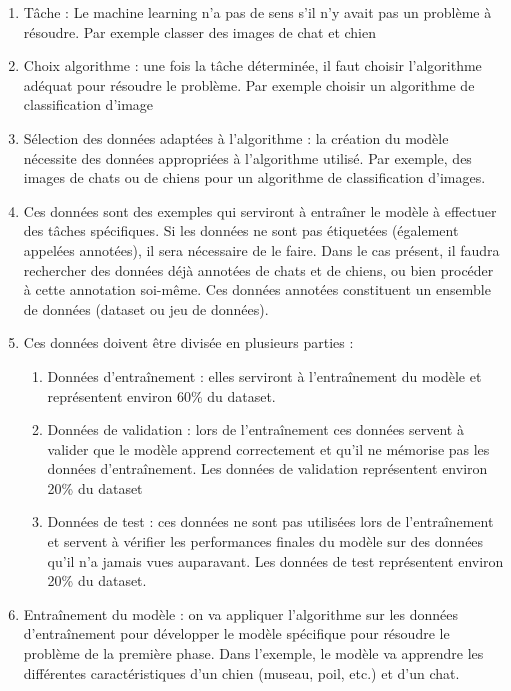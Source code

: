 \begin{enumerate}
    \item Tâche : Le machine learning n'a pas de sens s'il n'y avait pas un problème à résoudre. Par exemple classer des images de chat et chien
    
    \item Choix algorithme : une fois la tâche déterminée, il faut choisir l'algorithme adéquat pour résoudre le problème. Par exemple choisir un algorithme de classification d'image
    
    \item Sélection des données adaptées à l'algorithme : la création du modèle nécessite des données appropriées à l'algorithme utilisé. Par exemple, des images de chats ou de chiens pour un algorithme de classification d'images.
    
    \item Ces données sont des exemples qui serviront à entraîner le modèle à effectuer des tâches spécifiques. Si les données ne sont pas étiquetées (également appelées annotées), il sera nécessaire de le faire. Dans le cas présent, il faudra rechercher des données déjà annotées de chats et de chiens, ou bien procéder à cette annotation soi-même. Ces données annotées constituent un ensemble de données (dataset ou jeu de données).
    
    \item Ces données doivent être divisée en plusieurs parties :
    \begin{enumerate}
        \item Données d'entraînement : elles serviront à l'entraînement du modèle et représentent environ 60\% du dataset.
        \item Données de validation : lors de l’entraînement ces données servent à valider que le modèle apprend correctement et qu'il ne mémorise pas les données d’entraînement. Les données de validation représentent environ 20\% du dataset
        \item Données de test : ces données ne sont pas utilisées lors de l'entraînement et servent à vérifier les performances finales du modèle sur des données qu'il n'a jamais vues auparavant. Les données de test représentent environ 20\% du dataset.
    \end{enumerate}
    
    \item Entraînement du modèle : on va appliquer l'algorithme sur les données \\ d’entraînement pour développer le modèle spécifique pour résoudre le problème de la première phase. Dans l'exemple, le modèle va apprendre les différentes caractéristiques d'un chien (museau, poil, etc.) et d'un chat.
    

\end{enumerate}
